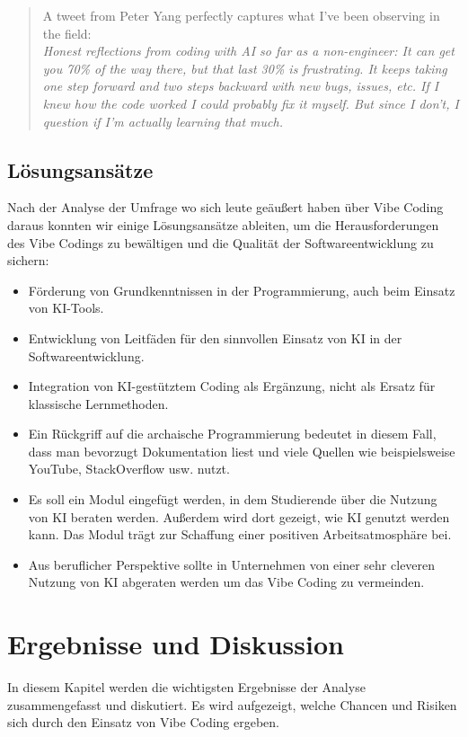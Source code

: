 \documentclass[paper=a4,fontsize=12pt,ngerman]{scrartcl}
\begin{document}
\begin{quote}
A tweet from Peter Yang perfectly captures what I’ve been observing in the field: \\
\textit{Honest reflections from coding with AI so far as a non-engineer: It can get you 70\% of the way there, but that last 30\% is frustrating. It keeps taking one step forward and two steps backward with new bugs, issues, etc. If I knew how the code worked I could probably fix it myself. But since I don’t, I question if I’m actually learning that much.}
\citep{VibeCodingTheFutureOfProgramming}
\end{quote}

\subsection{Lösungsansätze}
Nach der Analyse der Umfrage wo sich leute geäußert haben über Vibe Coding daraus konnten wir einige Lösungsansätze ableiten, um die Herausforderungen des Vibe Codings zu bewältigen und die Qualität der Softwareentwicklung zu sichern:
\begin{itemize}
    \item Förderung von Grundkenntnissen in der Programmierung, auch beim Einsatz von KI-Tools.
    \item Entwicklung von Leitfäden für den sinnvollen Einsatz von KI in der Softwareentwicklung.
    \item Integration von KI-gestütztem Coding als Ergänzung, nicht als Ersatz für klassische Lernmethoden.
    \item Ein Rückgriff auf die archaische Programmierung bedeutet in diesem Fall, dass man bevorzugt Dokumentation liest und viele Quellen wie beispielsweise YouTube, StackOverflow usw. nutzt.
    \item Es soll ein Modul eingefügt werden, in dem Studierende über die Nutzung von KI beraten werden. Außerdem wird dort gezeigt, wie KI genutzt werden kann. Das Modul trägt zur Schaffung einer positiven Arbeitsatmosphäre bei.
    \item Aus beruflicher Perspektive sollte in Unternehmen von einer sehr cleveren Nutzung von KI abgeraten werden um das Vibe Coding zu vermeinden.  
\end{itemize}

\clearpage
\section{Ergebnisse und Diskussion}
In diesem Kapitel werden die wichtigsten Ergebnisse der Analyse zusammengefasst und diskutiert. Es wird aufgezeigt, welche Chancen und Risiken sich durch den Einsatz von Vibe Coding ergeben.
\end{document}
